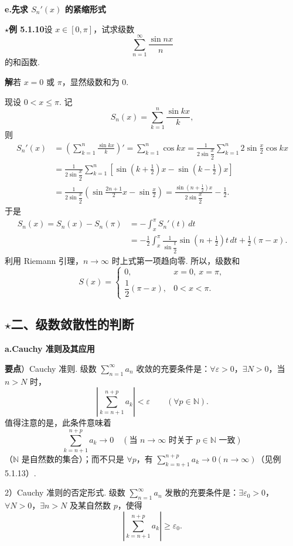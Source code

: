 \documentclass[UTF8, 12pt, fontset=fandol, oneside]{ctexart}
\begin{document}
\noindent\textbf{e.\quad 先求 $S_n'(x)$ 的紧缩形式}

\noindent\textbf{$\star$例 5.1.10}\quad 设 $x\in[0,\pi]$，试求级数
\[
  \sum_{n=1}^\infty \frac{\sin nx}{n}
\]
的和函数.

\noindent\textbf{解}\quad 若 $x=0$ 或 $\pi$，显然级数和为 $0$.

现设 $0<x\le\pi$. 记
\[
  S_n(x)=\sum_{k=1}^n\frac{\sin kx}{k},
\]
则
\[
\begin{aligned}
S_n'(x)
&=\left(\sum_{k=1}^n\frac{\sin kx}{k}\right)'
=\sum_{k=1}^n\cos kx
=\frac1{2\sin\dfrac x2}\sum_{k=1}^n 2\sin\frac x2\cos kx\\
&=\frac1{2\sin\dfrac x2}\sum_{k=1}^n
\left[\sin\left(k+\frac12\right)x-\sin\left(k-\frac12\right)x\right]\\
&=\frac1{2\sin\dfrac x2}\left(\sin\frac{2n+1}2x-\sin\frac x2\right)
=\frac{\sin\left(n+\frac12\right)x}{2\sin\dfrac x2}-\frac12.
\end{aligned}
\]
于是
\[
\begin{aligned}
S_n(x)=S_n(x)-S_n(\pi)
&=-\int_x^\pi S_n'(t)\,dt\\
&=-\frac12\int_x^\pi\frac1{\sin\dfrac t2}\sin\left(n+\frac12\right)t\,dt
  +\frac12(\pi-x).
\end{aligned}
\]
利用 Riemann 引理，$n\to\infty$ 时上式第一项趋向零. 所以，级数和
\[
  S(x)=
  \begin{cases}
  0, & x=0,\ x=\pi,\\[2mm]
  \dfrac12(\pi-x), & 0<x<\pi.
  \end{cases}
\]

\subsection*{$\star$二、级数敛散性的判断}

\noindent\textbf{a.\quad Cauchy 准则及其应用}

\noindent\textbf{要点}）Cauchy 准则. 级数 $\displaystyle\sum_{n=1}^\infty a_n$ 收敛的充要条件是：$\forall\varepsilon>0$，$\exists N>0$，当 $n>N$ 时，
\[
  \left|\sum_{k=n+1}^{n+p}a_k\right|<\varepsilon\qquad(\forall p\in\mathbb{N}).
\]
值得注意的是，此条件意味着
\[
  \sum_{k=n+1}^{n+p}a_k\to0\quad(\text{当 }n\to\infty\text{ 时关于 }p\in\mathbb{N}\text{ 一致})
\]
（$\mathbb{N}$ 是自然数的集合）；而不只是 $\forall p$，有 $\displaystyle\sum_{k=n+1}^{n+p}a_k\to0(n\to\infty)$（见例 5.1.13）.

2）Cauchy 准则的否定形式. 级数 $\displaystyle\sum_{n=1}^\infty a_n$ 发散的充要条件是：$\exists\varepsilon_0>0$，$\forall N>0$，$\exists n>N$ 及某自然数 $p$，使得
\[
  \left|\sum_{k=n+1}^{n+p}a_k\right|\ge\varepsilon_0.
\]
\end{document}
